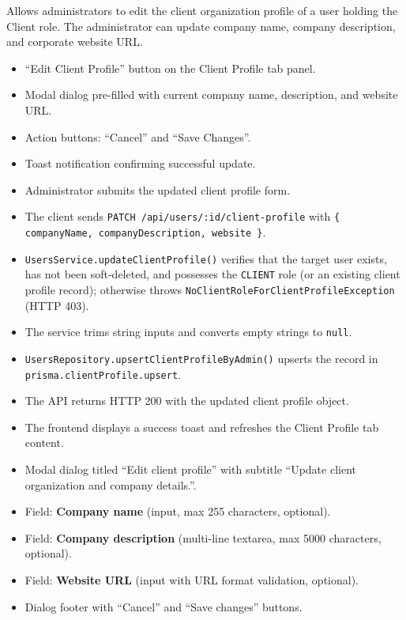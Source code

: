 \noindent Allows administrators to edit the client organization profile of a user holding the Client role. The administrator can update company name, company description, and corporate website URL.

\begin{itemize}[leftmargin=1.6em,topsep=3pt,itemsep=2pt,parsep=0pt,label=$\bullet$]
    \item ``Edit Client Profile'' button on the Client Profile tab panel.
    \item Modal dialog pre-filled with current company name, description, and website URL.
    \item Action buttons: ``Cancel'' and ``Save Changes''.
    \item Toast notification confirming successful update.
\end{itemize}

\begin{itemize}[leftmargin=1.6em,topsep=3pt,itemsep=2pt,parsep=0pt,label=$\bullet$]
    \item Administrator submits the updated client profile form.
    \item The client sends \texttt{PATCH /api/users/:id/client-profile} with \texttt{\{ companyName, companyDescription, website \}}.
    \item \texttt{UsersService.updateClientProfile()} verifies that the target user exists, has not been soft-deleted, and possesses the \texttt{CLIENT} role (or an existing client profile record); otherwise throws \texttt{NoClientRoleForClientProfileException} (HTTP 403).
    \item The service trims string inputs and converts empty strings to \texttt{null}.
    \item \texttt{UsersRepository.upsertClientProfileByAdmin()} upserts the record in \texttt{prisma.clientProfile.upsert}.
    \item The API returns HTTP 200 with the updated client profile object.
    \item The frontend displays a success toast and refreshes the Client Profile tab content.
\end{itemize}

\begin{itemize}[leftmargin=1.6em,topsep=3pt,itemsep=2pt,parsep=0pt,label=$\bullet$]
    \item Modal dialog titled ``Edit client profile'' with subtitle ``Update client organization and company details.''.
    \item Field: \textbf{Company name} (input, max 255 characters, optional).
    \item Field: \textbf{Company description} (multi-line textarea, max 5000 characters, optional).
    \item Field: \textbf{Website URL} (input with URL format validation, optional).
    \item Dialog footer with ``Cancel'' and ``Save changes'' buttons.
\end{itemize}


